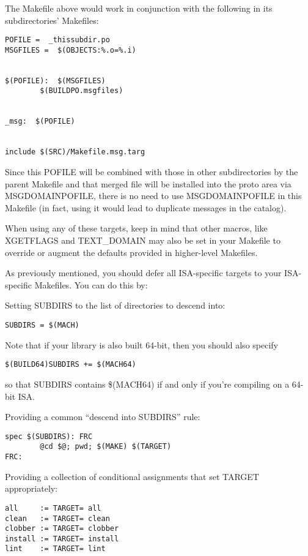 \documentclass{article}
\begin{document}
The Makefile above would work in conjunction with the following in its
subdirectories' Makefiles:

\begin{verbatim}
POFILE =  _thissubdir.po
MSGFILES =  $(OBJECTS:%.o=%.i)


$(POFILE):  $(MSGFILES)
        $(BUILDPO.msgfiles)


_msg:  $(POFILE)


include $(SRC)/Makefile.msg.targ

\end{verbatim}

Since this POFILE will be combined with those in other subdirectories by the
parent Makefile and that merged file will be installed into the proto area via
MSGDOMAINPOFILE, there is no need to use MSGDOMAINPOFILE in this Makefile (in
fact, using it would lead to duplicate messages in the catalog).

When using any of these targets, keep in mind that other macros, like XGETFLAGS
and TEXT\_DOMAIN may also be set in your Makefile to override or augment the
defaults provided in higher-level Makefiles.

As previously mentioned, you should defer all ISA-specific targets to your
ISA-specific Makefiles. You can do this by:

Setting SUBDIRS to the list of directories to descend into:

\begin{verbatim}
SUBDIRS = $(MACH)
\end{verbatim}

Note that if your library is also built 64-bit, then you should also specify

\begin{verbatim}
$(BUILD64)SUBDIRS += $(MACH64)
\end{verbatim}

so that SUBDIRS contains \$(MACH64) if and only if you're compiling on a 64-bit
ISA.

\vspace{0.1cm}
Providing a common ``descend into SUBDIRS'' rule:

\begin{verbatim}
spec $(SUBDIRS): FRC
        @cd $@; pwd; $(MAKE) $(TARGET)
FRC:
\end{verbatim}

Providing a collection of conditional assignments that set TARGET appropriately:

\begin{verbatim}
all     := TARGET= all
clean   := TARGET= clean
clobber := TARGET= clobber
install := TARGET= install
lint    := TARGET= lint
\end{verbatim}
\end{document}
